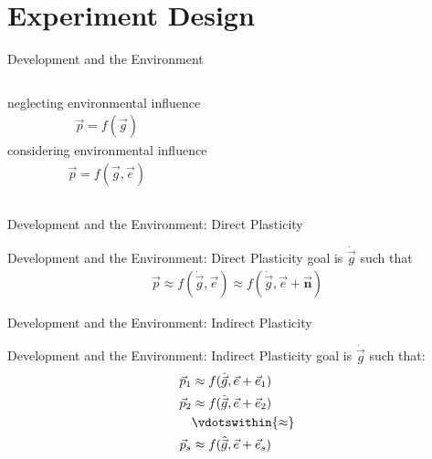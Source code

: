 \section{Experiment Design}

\begin{frame}{Development and the Environment}
\begin{columns}
neglecting environmental influence
\begin{align*}
\vec{p} = f(\vec{g})
\end{align*}
considering environmental influence
\begin{align*}
\vec{p} = f(\vec{g}, \vec{e})
\end{align*}
\end{columns}
\end{frame}

\begin{frame}{Development and the Environment: Direct Plasticity}
  
\end{frame}

\begin{frame}{Development and the Environment: Direct Plasticity}
goal is $\dot{\vec{g}}$ such that
\begin{align*}
\vec{p} \approx f(\dot{\vec{g}}, \vec{e})  \approx f(\dot{\vec{g}}, \vec{e} + \bm{\vec{n}})
\end{align*}
\end{frame}

\begin{frame}{Development and the Environment: Indirect Plasticity}
  
\end{frame}

\begin{frame}{Development and the Environment: Indirect Plasticity}
goal is $\dot{\vec{g}}$ such that:
\begin{align*}
\vec{p}_1 &\approx f(\hat{\vec{g}}, \vec{e} + \vec{e}_1) \\
\vec{p}_2 &\approx f(\hat{\vec{g}}, \vec{e} + \vec{e}_2) \\
&\vdotswithin{\approx} \\
\vec{p}_s &\approx f(\hat{\vec{g}}, \vec{e} + \vec{e}_s)
\end{align*}
\end{frame}

